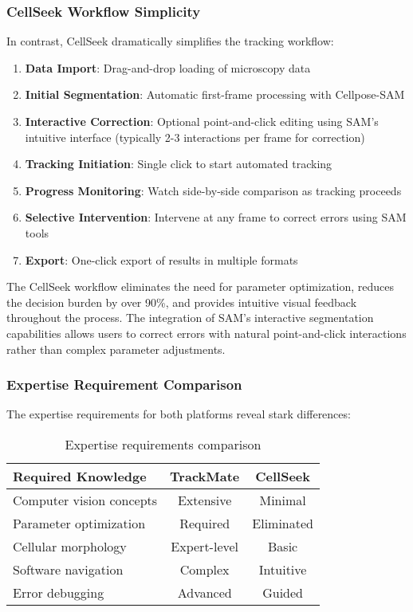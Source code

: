 \documentclass[12pt]{article}
\begin{document}
\subsubsection{CellSeek Workflow Simplicity}

In contrast, CellSeek dramatically simplifies the tracking workflow:

\begin{enumerate}
  \item \textbf{Data Import}: Drag-and-drop loading of microscopy data
  \item \textbf{Initial Segmentation}: Automatic first-frame processing with Cellpose-SAM
  \item \textbf{Interactive Correction}: Optional point-and-click editing using SAM's intuitive interface (typically 2-3 interactions per frame for correction)
  \item \textbf{Tracking Initiation}: Single click to start automated tracking
  \item \textbf{Progress Monitoring}: Watch side-by-side comparison as tracking proceeds
  \item \textbf{Selective Intervention}: Intervene at any frame to correct errors using SAM tools
  \item \textbf{Export}: One-click export of results in multiple formats
\end{enumerate}

The CellSeek workflow eliminates the need for parameter optimization, reduces the decision burden by over 90\%, and provides intuitive visual feedback throughout the process. The integration of SAM's interactive segmentation capabilities allows users to correct errors with natural point-and-click interactions rather than complex parameter adjustments.

\subsubsection{Expertise Requirement Comparison}

The expertise requirements for both platforms reveal stark differences:

\begin{table}[H]
  \centering
  \caption{Expertise requirements comparison}
  \begin{tabular}{lcc}
    \toprule
    \textbf{Required Knowledge} & \textbf{TrackMate} & \textbf{CellSeek} \\
    \midrule
    Computer vision concepts    & Extensive          & Minimal           \\
    Parameter optimization      & Required           & Eliminated        \\
    Cellular morphology         & Expert-level       & Basic             \\
    Software navigation         & Complex            & Intuitive         \\
    Error debugging             & Advanced           & Guided            \\
    \bottomrule
  \end{tabular}
\end{table}
\end{document}
